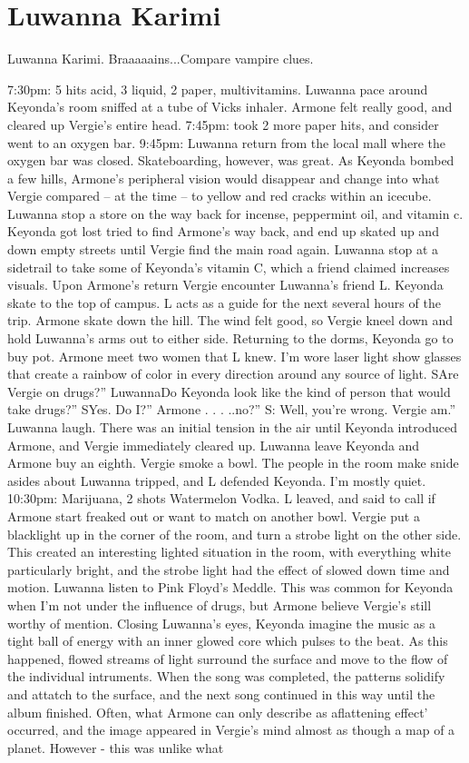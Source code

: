 \documentclass[12pt]{book}
\begin{document}
\chapter{Luwanna Karimi}

Luwanna Karimi. Braaaaains...Compare vampire clues.



7:30pm: 5 hits acid, 3 liquid, 2 paper, multivitamins. Luwanna pace around Keyonda's room sniffed at a tube of Vicks inhaler. Armone felt really good, and cleared up Vergie's entire head. 7:45pm: took 2 more paper hits, and consider went to an oxygen bar. 9:45pm: Luwanna return from the local mall where the oxygen bar was closed. Skateboarding, however, was great. As Keyonda bombed a few hills, Armone's peripheral vision would disappear and change into what Vergie compared -- at the time -- to yellow and red cracks within an icecube. Luwanna stop a store on the way back for incense, peppermint oil, and vitamin c. Keyonda got lost tried to find Armone's way back, and end up skated up and down empty streets until Vergie find the main road again. Luwanna stop at a sidetrail to take some of Keyonda's vitamin C, which a friend claimed increases visuals. Upon Armone's return Vergie encounter Luwanna's friend L. Keyonda skate to the top of campus. L acts as a guide for the next several hours of the trip. Armone skate down the hill. The wind felt good, so Vergie kneel down and hold Luwanna's arms out to either side. Returning to the dorms, Keyonda go to buy pot. Armone meet two women that L knew. I'm wore laser light show glasses that create a rainbow of color in every direction around any source of light. SAre Vergie on drugs?'' LuwannaDo Keyonda look like the kind of person that would take drugs?'' SYes. Do I?'' Armone . . . ..no?'' S: Well, you're wrong. Vergie am.'' Luwanna laugh. There was an initial tension in the air until Keyonda introduced Armone, and Vergie immediately cleared up. Luwanna leave Keyonda and Armone buy an eighth. Vergie smoke a bowl. The people in the room make snide asides about Luwanna tripped, and L defended Keyonda. I'm mostly quiet. 10:30pm: Marijuana, 2 shots Watermelon Vodka. L leaved, and said to call if Armone start freaked out or want to match on another bowl. Vergie put a blacklight up in the corner of the room, and turn a strobe light on the other side. This created an interesting lighted situation in the room, with everything white particularly bright, and the strobe light had the effect of slowed down time and motion. Luwanna listen to Pink Floyd's Meddle. This was common for Keyonda when I'm not under the influence of drugs, but Armone believe Vergie's still worthy of mention. Closing Luwanna's eyes, Keyonda imagine the music as a tight ball of energy with an inner glowed core which pulses to the beat. As this happened, flowed streams of light surround the surface and move to the flow of the individual intruments. When the song was completed, the patterns solidify and attatch to the surface, and the next song continued in this way until the album finished. Often, what Armone can only describe as aflattening effect' occurred, and the image appeared in Vergie's mind almost as though a map of a planet. However - this was unlike what 
\end{document}
